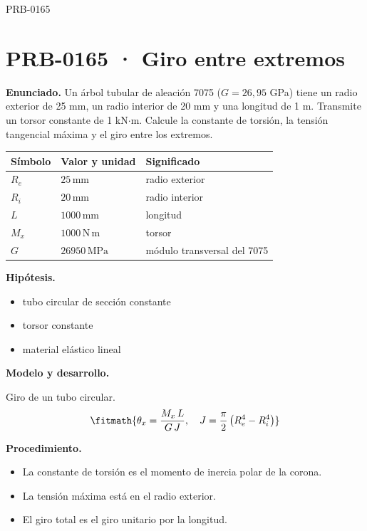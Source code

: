 
\Needspace{.3\textheight}

\begin{studiumworked}{PRB-0165}

\section{PRB-0165 · Giro entre extremos}

\textbf{Enunciado.} Un árbol tubular de aleación 7075 ($G = 26{,}95$ GPa) tiene un radio exterior de 25 mm, un radio interior de 20 mm y una longitud de 1 m. Transmite un torsor constante de 1 kN$\cdot$m. Calcule la constante de torsión, la tensión tangencial máxima y el giro entre los extremos.

\par\medskip\noindent\begin{tabular}{@{}p{.18\linewidth}p{.26\linewidth}p{.48\linewidth}@{}}
\toprule Símbolo & Valor y unidad & Significado\\\midrule
$R_{e}$ & $25\,\mathrm{mm}$ & radio exterior\\
$R_{i}$ & $20\,\mathrm{mm}$ & radio interior\\
$L$ & $1000\,\mathrm{mm}$ & longitud\\
$M_{x}$ & $1000\,\mathrm{N\,m}$ & torsor\\
$G$ & $26950\,\mathrm{MPa}$ & módulo transversal del 7075\\
\bottomrule\end{tabular}\par\medskip

\textbf{Hipótesis.}\begin{itemize}\item tubo circular de sección constante
\item torsor constante
\item material elástico lineal\end{itemize}

\textbf{Modelo y desarrollo.}

Giro de un tubo circular.\[\fitmath{\theta_x = \frac{M_x\,L}{G\,J},\quad J = \frac{\pi}{2}\left(R_e^{4} - R_i^{4}\right)}\]

\textbf{Procedimiento.}\begin{itemize}\item La constante de torsión es el momento de inercia polar de la corona.
\item La tensión máxima está en el radio exterior.
\item El giro total es el giro unitario por la longitud.\end{itemize}


\end{studiumworked}
